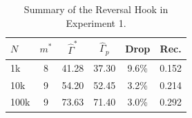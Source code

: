 \begin{table}[tb]
\centering
\scriptsize
\caption{Summary of the Reversal Hook in Experiment 1.}
\label{tab:reversal_hook_summary}
\setlength{\tabcolsep}{3pt}
\begin{tabular}{lccccc}
\toprule
$N$ & $m^*$ & $\hat{\Gamma}^*$ & $\hat{\Gamma}_p$ & Drop & Rec. \\
\midrule
1k & 8 & 41.28 & 37.30 & 9.6\% & 0.152 \\
10k & 9 & 54.20 & 52.45 & 3.2\% & 0.214 \\
100k & 9 & 73.63 & 71.40 & 3.0\% & 0.292 \\
\bottomrule
\end{tabular}
\end{table}